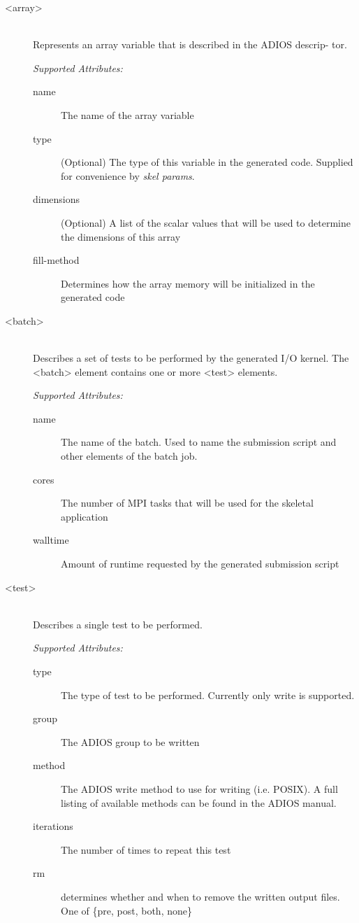 \begin{description}
  \item[<array>] \hfill \\
Represents an array variable that is described in the ADIOS descrip-
tor.

{\it Supported Attributes:}
  \begin{description}
    \item[name]
The name of the array variable
    \item[type]
(Optional) The type of this variable in the generated code. Supplied
for convenience by {\it skel params}.
    \item[dimensions]
(Optional) A list of the scalar values that will be used to
determine the dimensions of this array
    \item[fill-method]
Determines how the array memory will be initialized in the
generated code
  \end{description}
  \item[<batch>] \hfill \\
Describes a set of tests to be performed by the generated I/O kernel.
The <batch> element contains one or more <test> elements.

{\it Supported Attributes:}
  \begin{description}
    \item[name]
The name of the batch. Used to name the submission script and
other elements of the batch job.
    \item[cores]
The number of MPI tasks that will be used for the skeletal application
    \item[walltime]
Amount of runtime requested by the generated submission script
  \end{description}
  \item[<test>] \hfill \\
Describes a single test to be performed.

{\it Supported Attributes:}
  \begin{description}
    \item[type]
The type of test to be performed. Currently only write is supported.
    \item[group]
The ADIOS group to be written
    \item[method]
The ADIOS write method to use for writing (i.e. POSIX). A
full listing of available methods can be found in the ADIOS manual.
    \item[iterations]
The number of times to repeat this test
    \item[rm]
determines whether and when to remove the written output files. One
of \{pre, post, both, none\}
  \end{description}
\end{description}

